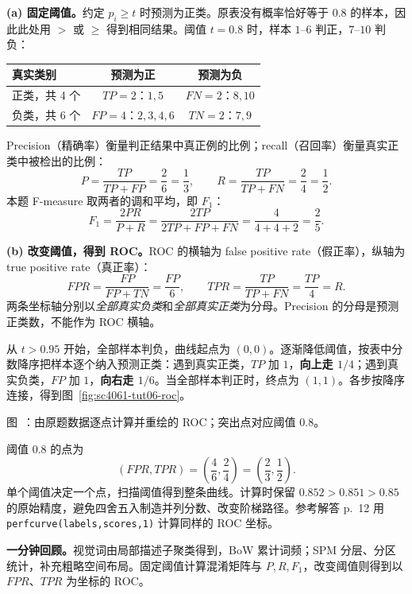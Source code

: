 \begin{checkedsolution}
\textbf{(a) 固定阈值。}约定 $p_i\ge t$ 时预测为正类。原表没有概率恰好等于 $0.8$ 的样本，因此此处用 $>$ 或 $\ge$ 得到相同结果。阈值 $t=0.8$ 时，样本 $1$--$6$ 判正，$7$--$10$ 判负：

\begin{center}
\begin{tabular}{@{}lcc@{}}
\toprule
真实类别 & 预测为正 & 预测为负 \\
\midrule
正类，共 4 个 & $TP=2$：$1,5$ & $FN=2$：$8,10$ \\
负类，共 6 个 & $FP=4$：$2,3,4,6$ & $TN=2$：$7,9$ \\
\bottomrule
\end{tabular}
\end{center}

Precision（精确率）衡量判正结果中真正例的比例；recall（召回率）衡量真实正类中被检出的比例：
\[
  P=\frac{TP}{TP+FP}=\frac{2}{6}=\boxed{\frac13},\qquad
  R=\frac{TP}{TP+FN}=\frac{2}{4}=\boxed{\frac12}.
\]
本题 F-measure 取两者的调和平均，即 $F_1$：
\[
  F_1=\frac{2PR}{P+R}
     =\frac{2TP}{2TP+FP+FN}
     =\frac{4}{4+4+2}=\boxed{\frac25}.
\]

\textbf{(b) 改变阈值，得到 ROC。}ROC 的横轴为 false positive rate（假正率），纵轴为 true positive rate（真正率）：
\[
  \boxed{FPR=\frac{FP}{FP+TN}=\frac{FP}{6}},\qquad
  \boxed{TPR=\frac{TP}{TP+FN}=\frac{TP}{4}=R}.
\]
两条坐标轴分别以\emph{全部真实负类}和\emph{全部真实正类}为分母。Precision 的分母是预测正类数，不能作为 ROC 横轴。

从 $t>0.95$ 开始，全部样本判负，曲线起点为 $(0,0)$。逐渐降低阈值，按表中分数降序把样本逐个纳入预测正类：遇到真实正类，$TP$ 加 $1$，\textbf{向上走 $1/4$}；遇到真实负类，$FP$ 加 $1$，\textbf{向右走 $1/6$}。当全部样本判正时，终点为 $(1,1)$。各步按降序连接，得到图~\ref{fig:sc4061-tut06-roc}。

\begin{center}
  
  \par\smallskip
  \label{fig:sc4061-tut06-roc}
  {\small 图~\thefigure：由原题数据逐点计算并重绘的 ROC；突出点对应阈值 $0.8$。}
\end{center}

阈值 $0.8$ 的点为
\[
  (FPR,TPR)=\left(\frac{4}{6},\frac{2}{4}\right)
           =\boxed{\left(\frac23,\frac12\right)}.
\]
单个阈值决定一个点，扫描阈值得到整条曲线。计算时保留 $0.852>0.851>0.85$ 的原始精度，避免四舍五入制造并列分数、改变阶梯路径。参考解答 p.~12 用 \texttt{perfcurve(labels,scores,1)} 计算同样的 ROC 坐标。
\end{checkedsolution}

\textbf{一分钟回顾。}视觉词由局部描述子聚类得到，BoW 累计词频；SPM 分层、分区统计，补充粗略空间布局。固定阈值计算混淆矩阵与 $P,R,F_1$，改变阈值则得到以 $FPR$、$TPR$ 为坐标的 ROC。
